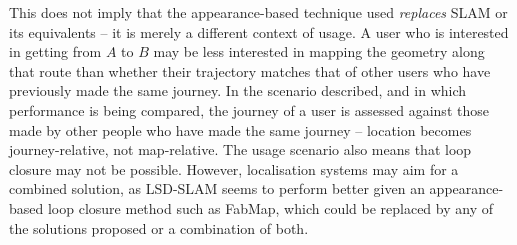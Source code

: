This does not imply that the appearance-based technique used \textit{replaces} SLAM or its equivalents -- it is merely a different context of usage. A user who is interested in getting from $A$ to $B$ may be less interested in mapping the geometry along that route than whether their trajectory matches that of other users who have previously made the same journey. In the scenario described, and in which performance is being compared, the journey of a user is assessed against those made by other people who have made the same journey -- location becomes journey-relative, not map-relative. The usage scenario also means that loop closure may not be possible. However, localisation systems may aim for a combined solution, as LSD-SLAM seems to perform better given an appearance-based loop closure method \citep{engel14eccv} such as FabMap, which could be replaced by any of the solutions proposed \citep{Rivera-Rubio2015PRL} or a combination of both.


